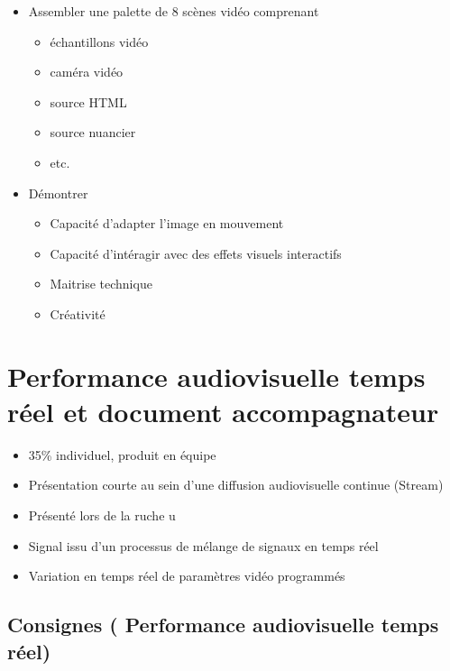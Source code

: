 \documentclass[
]{book}
\providecommand{\tightlist}{%
  \setlength{\itemsep}{0pt}\setlength{\parskip}{0pt}}
\begin{document}
\begin{itemize}
\tightlist
\item
  Assembler une palette de 8 scènes vidéo comprenant

  \begin{itemize}
  \tightlist
  \item
    échantillons vidéo
  \item
    caméra vidéo
  \item
    source HTML
  \item
    source nuancier
  \item
    etc.
  \end{itemize}
\item
  Démontrer

  \begin{itemize}
  \tightlist
  \item
    Capacité d'adapter l'image en mouvement
  \item
    Capacité d'intéragir avec des effets visuels interactifs
  \item
    Maitrise technique
  \item
    Créativité
  \end{itemize}
\end{itemize}

\hypertarget{sommatif_5}{%
\section{Performance audiovisuelle temps réel et document accompagnateur}\label{sommatif_5}}

\begin{itemize}
\tightlist
\item
  35\% individuel, produit en équipe
\item
  Présentation courte au sein d'une diffusion audiovisuelle continue (Stream)
\item
  Présenté lors de la ruche u
\item
  Signal issu d'un processus de mélange de signaux en temps réel
\item
  Variation en temps réel de paramètres vidéo programmés
\end{itemize}

\hypertarget{consignes-performance-audiovisuelle-temps-ruxe9el}{%
\subsection{Consignes ( Performance audiovisuelle temps réel)}\label{consignes-performance-audiovisuelle-temps-ruxe9el}}
\end{document}
